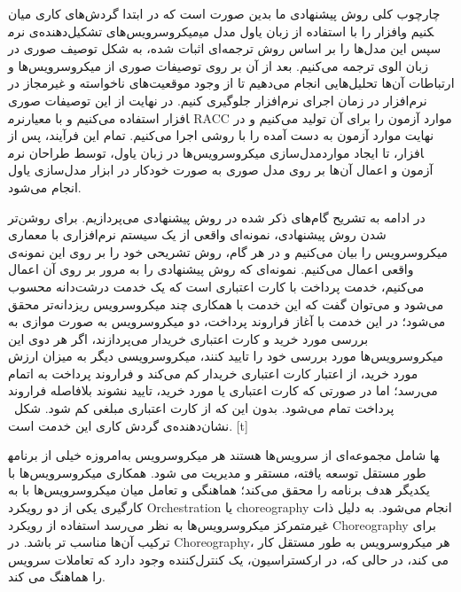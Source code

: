 

چارچوب کلی روش پیشنهادی ما بدین صورت است که در ابتدا گردش‌های کاری میان میکروسرویس‌های تشکیل‌دهنده‌ی نرم‎افزار را با استفاده از زبان یاول مدل می‎کنیم و سپس این مدل‌ها را بر اساس روش ترجمه‌ای اثبات شده، به شکل توصیف صوری در زبان الوی ترجمه می‌کنیم. بعد از آن بر روی توصیفات صوری از میکروسرویس‌ها و ارتباطات آن‌ها تحلیل‌هایی انجام می‌دهیم تا از وجود موقعیت‌های ناخواسته و غیرمجاز در نرم‌افزار در زمان اجرای نرم‌افزار جلوگیری کنیم. در نهایت از این توصیفات صوری نرم‎افزار استفاده می‌کنیم و با معیار RACC موارد آزمون را برای آن تولید می‌کنیم و در نهایت موارد آزمون به دست آمده را با روشی اجرا می‌کنیم. 
تمام این فرآیند، پس از مدل‌سازی میکروسرویس‌ها در زبان یاول، توسط طراحان نرم‎افزار، تا ایجاد موارد آزمون و اعمال آن‌ها بر روی مدل صوری به صورت خودکار در ابزار مدل‌سازی یاول انجام می‌شود.

در ادامه به تشریح گام‌های ذکر شده در روش پیشنهادی می‌پردازیم. برای روشن‌تر شدن روش پیشنهادی، نمونه‌ای واقعی از یک سیستم نرم‌افزاری با معماری میکروسرویس را بیان می‌کنیم و در هر گام، روش تشریحی خود را بر روی این نمونه‌ی واقعی اعمال می‌کنیم.
نمونه‌ای که روش پیشنهادی را به مرور بر روی آن اعمال می‌کنیم، خدمت پرداخت با کارت اعتباری است که یک خدمت درشت‌دانه محسوب می‌شود و می‌توان گفت که این خدمت با همکاری چند میکروسرویس ریزدانه‌تر محقق می‌شود؛ در این خدمت با آغاز فراروند پرداخت، دو میکروسرویس به صورت موازی به بررسی مورد خرید و کارت اعتباری خریدار می‌پردازند، اگر هر دوی این میکروسرویس‌ها مورد بررسی خود را تایید کنند، میکروسرویسی دیگر به میزان ارزش مورد خرید، از اعتبار کارت اعتباری خریدار کم می‌کند و فراروند پرداخت به اتمام می‌رسد؛ اما در صورتی که کارت اعتباری یا مورد خرید،  تایید نشوند بلافاصله فراروند پرداخت تمام می‌شود. بدون این که از کارت اعتباری مبلغی کم شود. شکل~ نشان‌دهنده‌ی گردش کاری این خدمت است.
[t]
\vspace{0.5em}

امروزه خیلی از برنامه‎ها شامل مجموعه‌ای از سرویس‌ها هستند هر میکروسرویس به طور مستقل توسعه یافته، مستقر و مدیریت می شود. 
همکاری میکروسرویس‌ها با یکدیگر هدف برنامه را محقق می‌کند؛ هماهنگی و تعامل میان میکروسرویس‌ها با به کارگیری یکی از دو رویکرد Orchestration یا  choreography انجام می‌شود.
به دلیل ذات غیرمتمرکز میکروسرویس‌ها به نظر می‌رسد استفاده از رویکرد Choreography برای ترکیب آن‌ها مناسب تر باشد. 
در Choreography، هر میکروسرویس به طور مستقل کار می کند، در حالی که، در ارکستراسیون، یک کنترل‌کننده وجود دارد که تعاملات سرویس را هماهنگ می کند. 

